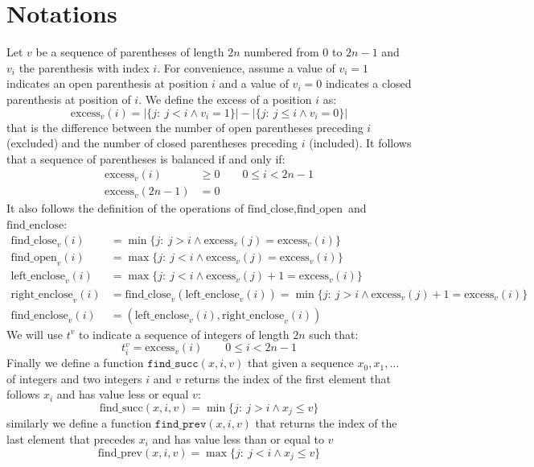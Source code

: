 \documentclass{article}
\begin{document}
\section{Notations}
Let $v$ be a sequence of parentheses of length $2n$ numbered from $0$ to $2n-1$ and $v_i$ the parenthesis with index $i$. For convenience, assume a value of $v_i=1$ indicates an open parenthesis at position $i$ and a value of $v_i=0$ indicates a closed parenthesis at position of $i$. We define the excess of a position $i$ as:
    $$
    \text{excess}_v(i) = |\{j :\ j<i \land v_i=1\}|-|\{j :\ j\leq i \land v_i=0\}|
    $$
that is the difference between the number of open parentheses preceding $i$ (excluded) and the number of closed parentheses preceding $i$ (included).
It follows that a sequence of parentheses is balanced if and only if:
    \begin{align*}
    \text{excess}_v(i) &\geq 0 \qquad 0\leq i < 2n-1 \\
    \text{excess}_v(2n-1) &= 0
    \end{align*}
It also follows the definition of the operations of $\text{find\_close}, \text{find\_open}$ and $\text{find\_enclose}$:
    \begin{align*}
    \text{find\_close}_v(i) &= \min\{j :\ j>i \land \text{excess}_v(j)=\text{excess}_v(i)\} \\
    \text{find\_open}_v(i) &= \max\{j :\ j<i \land \text{excess}_v(j)=\text{excess}_v(i)\} \\
    \text{left\_enclose}_v(i) &= \max\{j :\ j<i \land \text{excess}_v(j)+1=\text{excess}_v(i)\} \\
    \text{right\_enclose}_v(i) &= \text{find\_close}_v(\text{left\_enclose}_v(i)) = \min\{j :\ j>i \land \text{excess}_v(j)+1=\text{excess}_v(i)\} \\
    \text{find\_enclose}_v(i) &= (\text{left\_enclose}_v(i),\text{right\_enclose}_v(i))
    \end{align*}
We will use $t^v$ to indicate a sequence of integers of length $2n$ such that:
    $$
    t^v_i=\text{excess}_v(i) \qquad 0\leq i < 2n-1
    $$
Finally we define a function $\texttt{find\_succ}(x,i,v)$ that given a sequence $x_0,x_1,\dots$ of integers and two integers $i$ and $v$ returns the index of the first element that follows $x_i$ and has value less or equal $v$:
    $$
    \text{find\_succ}(x,i,v)=\min\{j :\ j>i \land x_j\leq v\}
    $$
similarly we define a function $\texttt{find\_prev}(x,i,v)$ that returns the index of the last element that precedes $x_i$ and has value less than or equal to $v$
    $$
    \text{find\_prev}(x,i,v)=\max\{j :\ j<i \land x_j\leq v\}
    $$
\end{document}
